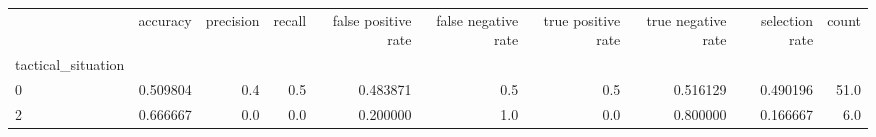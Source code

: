 \begin{tabular}{lrrrrrrrrr}
\toprule
{} &  accuracy &  precision &  recall &  false positive rate &  false negative rate &  true positive rate &  true negative rate &  selection rate &  count \\
tactical\_situation &           &            &         &                      &                      &                     &                     &                 &        \\
\midrule
0                  &  0.509804 &        0.4 &     0.5 &             0.483871 &                  0.5 &                 0.5 &            0.516129 &        0.490196 &   51.0 \\
2                  &  0.666667 &        0.0 &     0.0 &             0.200000 &                  1.0 &                 0.0 &            0.800000 &        0.166667 &    6.0 \\
\bottomrule
\end{tabular}
